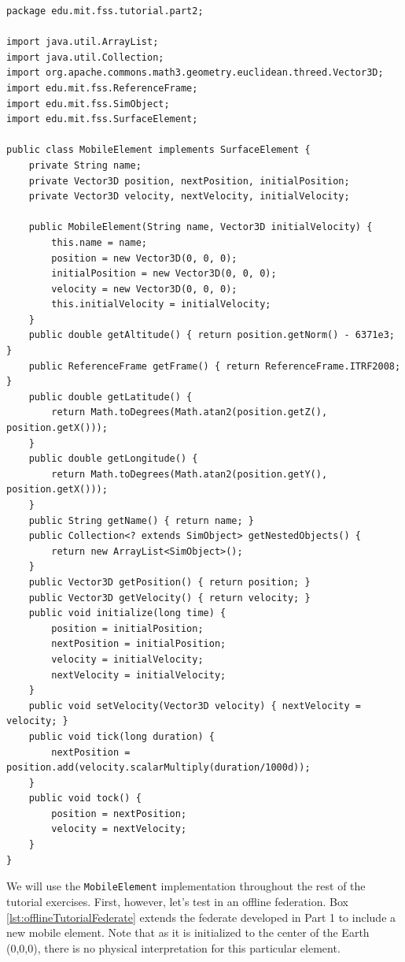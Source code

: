 \documentclass[]{article}
\begin{document}
\begin{Code}
\begin{lstlisting}[caption={MobileElement object class},label={lst:mobileElement}]
package edu.mit.fss.tutorial.part2;

import java.util.ArrayList;
import java.util.Collection;
import org.apache.commons.math3.geometry.euclidean.threed.Vector3D;
import edu.mit.fss.ReferenceFrame;
import edu.mit.fss.SimObject;
import edu.mit.fss.SurfaceElement;

public class MobileElement implements SurfaceElement {
	private String name;
	private Vector3D position, nextPosition, initialPosition;
	private Vector3D velocity, nextVelocity, initialVelocity;
	
	public MobileElement(String name, Vector3D initialVelocity) {
		this.name = name;
		position = new Vector3D(0, 0, 0);
		initialPosition = new Vector3D(0, 0, 0);
		velocity = new Vector3D(0, 0, 0);
		this.initialVelocity = initialVelocity;
	}
	public double getAltitude() { return position.getNorm() - 6371e3; }
	public ReferenceFrame getFrame() { return ReferenceFrame.ITRF2008; }
	public double getLatitude() {
		return Math.toDegrees(Math.atan2(position.getZ(), position.getX()));
	}
	public double getLongitude() {
		return Math.toDegrees(Math.atan2(position.getY(), position.getX()));
	}
	public String getName() { return name; }
	public Collection<? extends SimObject> getNestedObjects() {
		return new ArrayList<SimObject>();
	}
	public Vector3D getPosition() { return position; }
	public Vector3D getVelocity() { return velocity; }
	public void initialize(long time) {
		position = initialPosition;
		nextPosition = initialPosition;
		velocity = initialVelocity;
		nextVelocity = initialVelocity;
	}
	public void setVelocity(Vector3D velocity) { nextVelocity = velocity; }
	public void tick(long duration) {
		nextPosition = position.add(velocity.scalarMultiply(duration/1000d));
	}
	public void tock() {
		position = nextPosition;
		velocity = nextVelocity;
	}
}
\end{lstlisting}
\end{Code}

We will use the \texttt{MobileElement} implementation throughout the rest of the tutorial exercises. First, however, let's test in an offline federation. Box \ref{lst:offlineTutorialFederate} extends the federate developed in Part 1 to include a new mobile element. Note that as it is initialized to the center of the Earth (0,0,0), there is no physical interpretation for this particular element.
\end{document}

